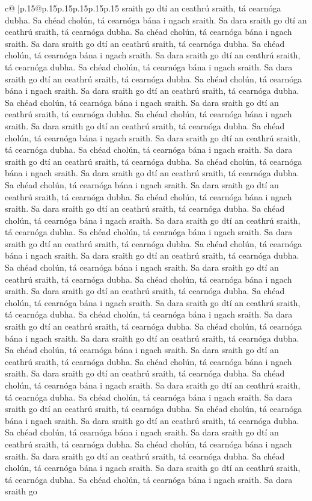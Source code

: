 \documentclass{article}
\begin{document}
{\begin{supertabular}{c@{$\;$}|p{.15\linewidth}@{}p{.15\linewidth}p{.15\linewidth}p{.15\linewidth}p{.15\linewidth}p{.15\linewidth}}
{{{sraith go dtí an ceathrú sraith, tá cearnóga dubha. Sa chéad cholún, tá cearnóga bána i ngach sraith. Sa dara sraith go dtí an ceathrú sraith, tá cearnóga dubha. Sa chéad cholún, tá cearnóga bána i ngach sraith. Sa dara sraith go dtí an ceathrú sraith, tá cearnóga dubha. Sa chéad cholún, tá cearnóga bána i ngach sraith. Sa dara sraith go dtí an ceathrú sraith, tá cearnóga dubha. Sa chéad cholún, tá cearnóga bána i ngach sraith. Sa dara sraith go dtí an ceathrú sraith, tá cearnóga dubha. Sa chéad cholún, tá cearnóga bána i ngach sraith. Sa dara sraith go dtí an ceathrú sraith, tá cearnóga dubha. Sa chéad cholún, tá cearnóga bána i ngach sraith. Sa dara sraith go dtí an ceathrú sraith, tá cearnóga dubha. Sa chéad cholún, tá cearnóga bána i ngach sraith. Sa dara sraith go dtí an ceathrú sraith, tá cearnóga dubha. Sa chéad cholún, tá cearnóga bána i ngach sraith. Sa dara sraith go dtí an ceathrú sraith, tá cearnóga dubha. Sa chéad cholún, tá cearnóga bána i ngach sraith. Sa dara sraith go dtí an ceathrú sraith, tá cearnóga dubha. Sa chéad cholún, tá cearnóga bána i ngach sraith. Sa dara sraith go dtí an ceathrú sraith, tá cearnóga dubha. Sa chéad cholún, tá cearnóga bána i ngach sraith. Sa dara sraith go dtí an ceathrú sraith, tá cearnóga dubha. Sa chéad cholún, tá cearnóga bána i ngach sraith. Sa dara sraith go dtí an ceathrú sraith, tá cearnóga dubha. Sa chéad cholún, tá cearnóga bána i ngach sraith. Sa dara sraith go dtí an ceathrú sraith, tá cearnóga dubha. Sa chéad cholún, tá cearnóga bána i ngach sraith. Sa dara sraith go dtí an ceathrú sraith, tá cearnóga dubha. Sa chéad cholún, tá cearnóga bána i ngach sraith. Sa dara sraith go dtí an ceathrú sraith, tá cearnóga dubha. Sa chéad cholún, tá cearnóga bána i ngach sraith. Sa dara sraith go dtí an ceathrú sraith, tá cearnóga dubha. Sa chéad cholún, tá cearnóga bána i ngach sraith. Sa dara sraith go dtí an ceathrú sraith, tá cearnóga dubha. Sa chéad cholún, tá cearnóga bána i ngach sraith. Sa dara sraith go dtí an ceathrú sraith, tá cearnóga dubha. Sa chéad cholún, tá cearnóga bána i ngach sraith. Sa dara sraith go dtí an ceathrú sraith, tá cearnóga dubha. Sa chéad cholún, tá cearnóga bána i ngach sraith. Sa dara sraith go dtí an ceathrú sraith, tá cearnóga dubha. Sa chéad cholún, tá cearnóga bána i ngach sraith. Sa dara sraith go dtí an ceathrú sraith, tá cearnóga dubha. Sa chéad cholún, tá cearnóga bána i ngach sraith. Sa dara sraith go dtí an ceathrú sraith, tá cearnóga dubha. Sa chéad cholún, tá cearnóga bána i ngach sraith. Sa dara sraith go dtí an ceathrú sraith, tá cearnóga dubha. Sa chéad cholún, tá cearnóga bána i ngach sraith. Sa dara sraith go dtí an ceathrú sraith, tá cearnóga dubha. Sa chéad cholún, tá cearnóga bána i ngach sraith. Sa dara sraith go dtí an ceathrú sraith, tá cearnóga dubha. Sa chéad cholún, tá cearnóga bána i ngach sraith. Sa dara sraith go dtí an ceathrú sraith, tá cearnóga dubha. Sa chéad cholún, tá cearnóga bána i ngach sraith. Sa dara sraith go dtí an ceathrú sraith, tá cearnóga dubha. Sa chéad cholún, tá cearnóga bána i ngach sraith. Sa dara sraith go dtí an ceathrú sraith, tá cearnóga dubha. Sa chéad cholún, tá cearnóga bána i ngach sraith. Sa dara sraith go }}}
\end{supertabular}}
\end{document}
